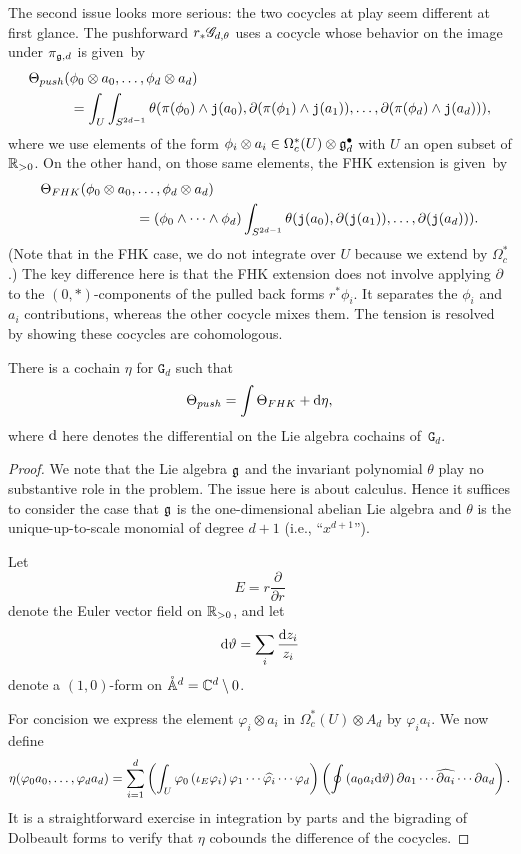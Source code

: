 The second issue looks more serious:
the two cocycles at play seem different at first glance.
The pushforward $r_* \mathscr G_{d,\theta}$ uses a cocycle whose behavior on the image under $\pi_{\mathfrak g, d}$ is given~by
\begin{align*}
\Theta_{push}(&\phi_0 \otimes a_0, \ldots, \phi_d \otimes a_d) \\
&= \int_U \int_{S^{2d-1}} \theta(\pi(\phi_0) \wedge {\mathtt{j}}(a_0),\partial (\pi(\phi_1) \wedge {\mathtt{j}}(a_1)),\ldots,\partial(\pi(\phi_d) \wedge {\mathtt{j}}(a_d))),
\end{align*}
where we use  elements of the form $\phi_i \otimes a_i \in \Omega^*_c(U) \otimes \mathfrak g^\bullet_d$ with $U$ an open subset of $\mathbb R_{>0}$.
On the other hand, on those same elements, the FHK extension is given~by
\begin{align*}
\Theta_{FHK}(\phi_0 \otimes a_0, &\ldots, \phi_d \otimes a_d) \\
&= (\phi_0 \wedge \cdots \wedge \phi_d) \int_{S^{2d-1}} \theta({\mathtt{j}}(a_0),\partial ({\mathtt{j}}(a_1)),\ldots,\partial({\mathtt{j}}(a_d))).
\end{align*}
(Note that in the FHK case, we do not integrate over $U$ because we extend by $\Omega^*_c$.)
The key difference here is that the FHK extension does not involve applying $\partial$ to the $(0,*)$-components of the pulled back forms $r^* \phi_i$.
It separates the $\phi_i$ and $a_i$ contributions,
whereas the other cocycle mixes them.
The tension is resolved by showing these cocycles are cohomologous.

\begin{lem}
There is a cochain $\eta$ for $\mathtt{G}_d$ such that
\[
\Theta_{push} = \int \Theta_{FHK} + {\rm d} \eta,
\]
where ${\rm d}$ here denotes the differential on the Lie algebra cochains of~$\mathtt{G}_d$.
\end{lem}

\begin{proof}
We note that the Lie algebra $\mathfrak g$ and the invariant polynomial $\theta$ play no substantive role in the problem.
The issue here is about calculus.
Hence it suffices to consider the case that $\mathfrak g$ is the one-dimensional abelian Lie algebra and $\theta$ is the unique-up-to-scale monomial of degree $d+1$ (i.e., ``$x^{d+1}$'').

Let
\[
E = r \frac{\partial}{\partial r}
\]
denote the Euler vector field on $\mathbb R_{>0}$,
and let
\[
{\rm d} \vartheta = \sum_i \frac{{\rm d} z_i}{z_i} 
\]
denote a $(1,0)$-form on $\mathring{\mathbb A}^d = \mathbb C^{d} \setminus 0$. 

For concision we express the element $\varphi_i \otimes a_i $ in $\Omega^*_c(U) \otimes A_d $ by $\varphi_i a_i$.
We now define
\[
\eta(\varphi_0 a_0,\ldots,\varphi_da_d) = \sum_{i=1}^d \left(\int_U \varphi_0 \left(\iota_{E} \varphi_i \right) \varphi_1 \cdots \widehat{\varphi_i} \cdots \varphi_d\right)\left(\oint \left(a_0 a_i {\rm d} \vartheta\right) \partial a_1 \cdots \widehat{\partial a_i} \cdots \partial a_d \right)  .
\]
It is a straightforward exercise in integration by parts and the bigrading of Dolbeault forms to verify that $\eta$ cobounds the difference of the cocycles.
\end{proof}

